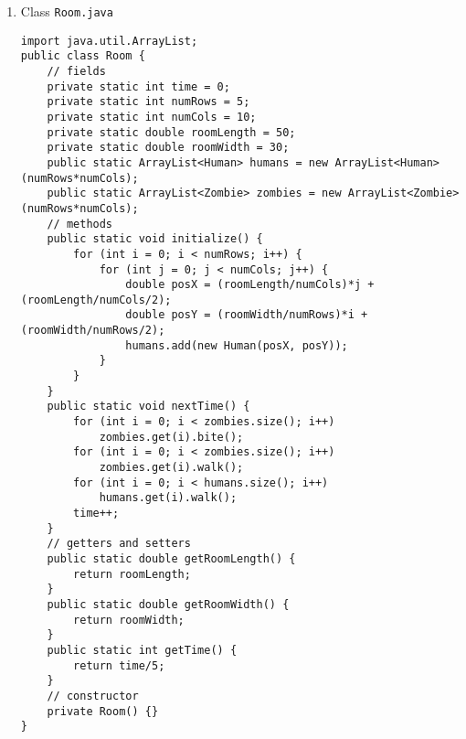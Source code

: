 \documentclass[12pt,letterpaper,twoside]{article}
\begin{document}
\begin{enumerate}
\lstset{language=java,tabsize=2}
\begin{lstlisting}
public class Zombie extends Person {
	// attribute
	private double speed = 1;
	private double range = 1;
	// constructors
	public Zombie(double posX, double posY) {
		super(posX, posY);
	}
	// methods
	@Override
	public void walk() {
		if (Room.humans.size() > 0) {
			double closestDistX = 0;
			double closestDistY = 0;
			double minDistance = 2*Room.getRoomLength();
			for (int i = 0; i < Room.humans.size(); i++) {
				double distX = this.getPosX() - Room.humans.get(i).getPosX();
				double distY = this.getPosY() - Room.humans.get(i).getPosY();
				double distance = Math.sqrt(Math.pow(distX, 2) + Math.pow(distY, 2));
				if (distance < minDistance) {
					minDistance = distance;
					closestDistX = distX;
					closestDistY = distY;
				}
			}
			double direction = Math.atan2(closestDistY, closestDistX);
			double newPosX = this.getPosX() + Math.cos(direction) * speed;
			double newPosY = this.getPosY() + Math.sin(direction) * speed;
			walkTo(newPosX, newPosY);
		}
	}
	public void bite() {
		for (int i = 0; i < Room.humans.size(); i++) {
			double distX = this.getPosX() - Room.humans.get(i).getPosX();
			double distY = this.getPosY() - Room.humans.get(i).getPosY();
			double distance = Math.sqrt(Math.pow(distX, 2) + Math.pow(distY, 2));
			if (distance < range) {
				Room.humans.get(i).turn();
			}
		}
	}
}
\end{lstlisting}

\item Class \texttt{Room.java}

\lstset{language=java,tabsize=2}
\begin{lstlisting}
import java.util.ArrayList;
public class Room {
	// fields
	private static int time = 0;
	private static int numRows = 5;
	private static int numCols = 10;
	private static double roomLength = 50;
	private static double roomWidth = 30;
	public static ArrayList<Human> humans = new ArrayList<Human>(numRows*numCols);
	public static ArrayList<Zombie> zombies = new ArrayList<Zombie>(numRows*numCols);
	// methods
	public static void initialize() {
		for (int i = 0; i < numRows; i++) {
			for (int j = 0; j < numCols; j++) {
				double posX = (roomLength/numCols)*j + (roomLength/numCols/2);
				double posY = (roomWidth/numRows)*i + (roomWidth/numRows/2);
				humans.add(new Human(posX, posY));
			}
		}
	}
	public static void nextTime() {
		for (int i = 0; i < zombies.size(); i++)
			zombies.get(i).bite();
		for (int i = 0; i < zombies.size(); i++)
			zombies.get(i).walk();
		for (int i = 0; i < humans.size(); i++)
			humans.get(i).walk();
		time++;
	}
	// getters and setters
	public static double getRoomLength() {
		return roomLength;
	}
	public static double getRoomWidth() {
		return roomWidth;
	}
	public static int getTime() {
		return time/5;
	}
	// constructor
	private Room() {}
}
\end{lstlisting}


\end{enumerate}
\end{document}
